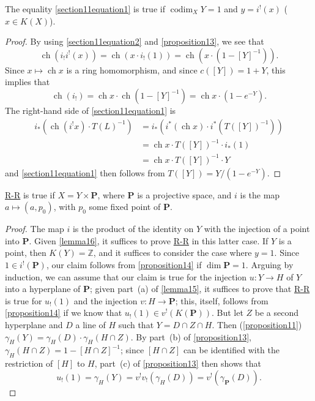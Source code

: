 \documentclass{article}
\theoremstyle{plain}
\newenvironment{proposition}[1]
    {\renewcommand\theinnercustomproposition{#1}\innercustomproposition}
    {\endinnercustomproposition}
\newenvironment{cor}[1]
    {\renewcommand\theinnercustomcor{#1}\innercustomcor}
    {\endinnercustomcor}
\theoremstyle{definition}
\newcommand{\PP}{\mathbf{P}}
\DeclareMathOperator{\ch}{ch}
\DeclareMathOperator{\codim}{codim}
\newcommand{\oldpage}[1]{\marginpar{\footnotesize$\Big\vert$ \textit{p.~#1}}}
\begin{document}
\begin{proposition}{14}
\label{proposition14}
  The equality \cref{section11equation1} is true if $\codim_XY=1$ and $y=i^!(x)$ ($x\in K(X)$).
\end{proposition}

\begin{proof}
  By using \cref{section11equation2} and \cref{proposition13}, we see that
  \[
    \ch(i_!i^!(x)) = \ch(x\cdot i_!(1)) = \ch(x\cdot(1-[Y]^{-1})).
  \]
  Since $x\mapsto\ch x$ is a ring homomorphism, and since $c([Y])=1+Y$,
\oldpage{125}
  this implies that
  \[
    \ch(i_!) = \ch x\cdot\ch(1-[Y]^{-1}) = \ch x\cdot(1-e^{-Y}).
  \]
  The right-hand side of \cref{section11equation1} is
  \begin{align*}
    i_*(\ch(i^!x)\cdot T(L)^{-1})
    &= i_*(i^*(\ch x)\cdot i^*(T([Y])^{-1}))
  \\&= \ch x\cdot T([Y])^{-1}\cdot i_*(1)
  \\&= \ch x\cdot T([Y])^{-1}\cdot Y
  \end{align*}
  and \cref{section11equation1} then follows from $T([Y])=Y/(1-e^{-Y})$.
\end{proof}

\begin{cor}{1}
\label{corollary1}
  \hyperref[theoremriemannroch]{R-R} is true if $X=Y\times\PP$, where $\PP$ is a projective space, and $i$ is the map $a\mapsto(a,p_0)$, with $p_0$ some fixed point of $\PP$.
\end{cor}

\begin{proof}
  The map $i$ is the product of the identity on $Y$ with the injection of a point into $\PP$.
  Given \cref{lemma16}, it suffices to prove \hyperref[theoremriemannroch]{R-R} in this latter case.
  If $Y$ is a point, then $K(Y)=\mathbb{Z}$, and it suffices to consider the case where $y=1$.
  Since $1\in i^!(\PP)$, our claim follows from \cref{proposition14} if $\dim\PP=1$.
  Arguing by induction, we can assume that our claim is true for the injection $u\colon Y\to H$ of $Y$ into a hyperplane of $\PP$;
  given part~(a) of \cref{lemma15}, it suffices to prove that \hyperref[theoremriemannroch]{R-R} is true for $u_!(1)$ and the injection $v\colon H\to \PP$;
  this, itself, follows from \cref{proposition14} if we know that $u_!(1)\in v^!(K(\PP))$.
  But let $Z$ be a second hyperplane and $D$ a line of $H$ such that $Y=D\cap Z\cap H$.
  Then (\cref{proposition11}) $\gamma_H(Y) = \gamma_H(D)\cdot\gamma_H(H\cap Z)$.
  By part~(b) of \cref{proposition13}, $\gamma_H(H\cap Z)=1-[H\cap Z]^{-1}$;
  since $[H\cap Z]$ can be identified with the restriction of $[H]$ to $H$, part~(c) of \cref{proposition13} then shows that
  \[
    u_!(1) = \gamma_H(Y) = v^!v_!(\gamma_H(D)) = v^!(\gamma_{\PP}(D)).
  \]
\end{proof}
\end{document}
